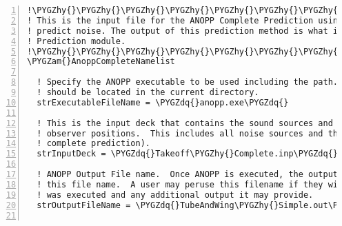 \documentclass[letterpaper,10pt,english]{sphinxmanual}
\def\PYGZam{\char`\&}
\def\PYGZhy{\char`\-}
\def\PYGZdq{\char`\"}
\begin{document}
\begin{Verbatim}[commandchars=\\\{\},numbers=left,firstnumber=1,stepnumber=1]
!\PYGZhy{}\PYGZhy{}\PYGZhy{}\PYGZhy{}\PYGZhy{}\PYGZhy{}\PYGZhy{}\PYGZhy{}\PYGZhy{}\PYGZhy{}\PYGZhy{}\PYGZhy{}\PYGZhy{}\PYGZhy{}\PYGZhy{}\PYGZhy{}\PYGZhy{}\PYGZhy{}\PYGZhy{}\PYGZhy{}\PYGZhy{}\PYGZhy{}\PYGZhy{}\PYGZhy{}\PYGZhy{}\PYGZhy{}\PYGZhy{}\PYGZhy{}\PYGZhy{}\PYGZhy{}\PYGZhy{}\PYGZhy{}\PYGZhy{}\PYGZhy{}\PYGZhy{}\PYGZhy{}\PYGZhy{}\PYGZhy{}\PYGZhy{}\PYGZhy{}\PYGZhy{}\PYGZhy{}\PYGZhy{}\PYGZhy{}\PYGZhy{}\PYGZhy{}\PYGZhy{}\PYGZhy{}\PYGZhy{}\PYGZhy{}\PYGZhy{}\PYGZhy{}\PYGZhy{}\PYGZhy{}\PYGZhy{}\PYGZhy{}\PYGZhy{}\PYGZhy{}\PYGZhy{}\PYGZhy{}\PYGZhy{}\PYGZhy{}\PYGZhy{}\PYGZhy{}\PYGZhy{}\PYGZhy{}\PYGZhy{}\PYGZhy{}\PYGZhy{}\PYGZhy{}\PYGZhy{}\PYGZhy{}\PYGZhy{}\PYGZhy{}\PYGZhy{}\PYGZhy{}\PYGZhy{}\PYGZhy{}\PYGZhy{}\PYGZhy{}\PYGZhy{}\PYGZhy{}\PYGZhy{}\PYGZhy{}
! This is the input file for the ANOPP Complete Prediction using ANOPP modules to
! predict noise. The output of this prediction method is what is with the ANOPP
! Prediction module.
!\PYGZhy{}\PYGZhy{}\PYGZhy{}\PYGZhy{}\PYGZhy{}\PYGZhy{}\PYGZhy{}\PYGZhy{}\PYGZhy{}\PYGZhy{}\PYGZhy{}\PYGZhy{}\PYGZhy{}\PYGZhy{}\PYGZhy{}\PYGZhy{}\PYGZhy{}\PYGZhy{}\PYGZhy{}\PYGZhy{}\PYGZhy{}\PYGZhy{}\PYGZhy{}\PYGZhy{}\PYGZhy{}\PYGZhy{}\PYGZhy{}\PYGZhy{}\PYGZhy{}\PYGZhy{}\PYGZhy{}\PYGZhy{}\PYGZhy{}\PYGZhy{}\PYGZhy{}\PYGZhy{}\PYGZhy{}\PYGZhy{}\PYGZhy{}\PYGZhy{}\PYGZhy{}\PYGZhy{}\PYGZhy{}\PYGZhy{}\PYGZhy{}\PYGZhy{}\PYGZhy{}\PYGZhy{}\PYGZhy{}\PYGZhy{}\PYGZhy{}\PYGZhy{}\PYGZhy{}\PYGZhy{}\PYGZhy{}\PYGZhy{}\PYGZhy{}\PYGZhy{}\PYGZhy{}\PYGZhy{}\PYGZhy{}\PYGZhy{}\PYGZhy{}\PYGZhy{}\PYGZhy{}\PYGZhy{}\PYGZhy{}\PYGZhy{}\PYGZhy{}\PYGZhy{}\PYGZhy{}\PYGZhy{}\PYGZhy{}\PYGZhy{}\PYGZhy{}\PYGZhy{}\PYGZhy{}\PYGZhy{}\PYGZhy{}\PYGZhy{}\PYGZhy{}\PYGZhy{}\PYGZhy{}\PYGZhy{}
\PYGZam{}AnoppCompleteNamelist

  ! Specify the ANOPP executable to be used including the path.  The ANOPP executable
  ! should be located in the current directory.
  strExecutableFileName = \PYGZdq{}anopp.exe\PYGZdq{}

  ! This is the input deck that contains the sound sources and the propagation to the 
  ! observer positions.  This includes all noise sources and their propagation (a 
  ! complete prediction).
  strInputDeck = \PYGZdq{}Takeoff\PYGZhy{}Complete.inp\PYGZdq{}

  ! ANOPP Output File name.  Once ANOPP is executed, the output of ANOPP is copied to
  ! this file name.  A user may peruse this filename if they wish to see how ANOPP 
  ! was executed and any additional output it may provide.
  strOutputFileName = \PYGZdq{}TubeAndWing\PYGZhy{}Simple.out\PYGZdq{}


\end{Verbatim}
\end{document}
